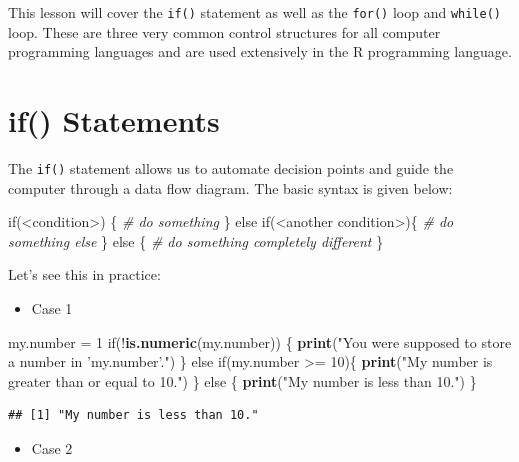 \documentclass[]{book}
\newenvironment{Shaded}{\begin{snugshade}}{\end{snugshade}}
\newcommand{\KeywordTok}[1]{\textcolor[rgb]{0.13,0.29,0.53}{\textbf{{#1}}}}
\newcommand{\DecValTok}[1]{\textcolor[rgb]{0.00,0.00,0.81}{{#1}}}
\newcommand{\StringTok}[1]{\textcolor[rgb]{0.31,0.60,0.02}{{#1}}}
\newcommand{\CommentTok}[1]{\textcolor[rgb]{0.56,0.35,0.01}{\textit{{#1}}}}
\newcommand{\NormalTok}[1]{{#1}}
\providecommand{\tightlist}{%
  \setlength{\itemsep}{0pt}\setlength{\parskip}{0pt}}
\begin{document}
This lesson will cover the \texttt{if()} statement as well as the
\texttt{for()} loop and \texttt{while()} loop. These are three very
common control structures for all computer programming languages and are
used extensively in the R programming language.

\section{if() Statements}\label{if-statements}

The \texttt{if()} statement allows us to automate decision points and
guide the computer through a data flow diagram. The basic syntax is
given below:

\begin{Shaded}
\begin{Highlighting}[]
\NormalTok{if(<condition>) \{}
  \CommentTok{# do something}
\NormalTok{\} else if(<another condition>)\{}
  \CommentTok{# do something else}
\NormalTok{\} else \{}
  \CommentTok{# do something completely different}
\NormalTok{\}}
\end{Highlighting}
\end{Shaded}

Let's see this in practice:

\begin{itemize}
\tightlist
\item
  Case 1
\end{itemize}

\begin{Shaded}
\begin{Highlighting}[]
\NormalTok{my.number =}\StringTok{ }\DecValTok{1}
\NormalTok{if(!}\KeywordTok{is.numeric}\NormalTok{(my.number)) \{}
  \KeywordTok{print}\NormalTok{(}\StringTok{"You were supposed to store a number in 'my.number'."}\NormalTok{)}
\NormalTok{\} else if(my.number >=}\StringTok{ }\DecValTok{10}\NormalTok{)\{}
  \KeywordTok{print}\NormalTok{(}\StringTok{"My number is greater than or equal to 10."}\NormalTok{)}
\NormalTok{\} else \{}
  \KeywordTok{print}\NormalTok{(}\StringTok{"My number is less than 10."}\NormalTok{)}
\NormalTok{\}}
\end{Highlighting}
\end{Shaded}

\begin{verbatim}
## [1] "My number is less than 10."
\end{verbatim}

\begin{itemize}
\tightlist
\item
  Case 2
\end{itemize}
\end{document}
